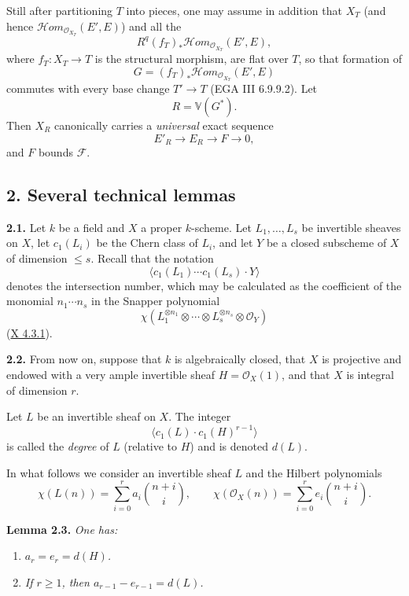 Still after partitioning \(T\) into pieces, one may assume in addition
that \(X_T\) (and hence
\(\mathcal H\!om_{\mathcal O_{X_T}}(E',E)\)) and all the
\[
R^q(f_T)_*\mathcal H\!om_{\mathcal O_{X_T}}(E',E),
\]
where \(f_T:X_T\to T\) is the structural morphism, are flat over \(T\),
so that formation of
\[
G=(f_T)_*\mathcal H\!om_{\mathcal O_{X_T}}(E',E)
\]
commutes with every base change \(T'\to T\) (EGA III 6.9.9.2). Let
\[
R=\mathbb V(G^*).
\]
Then \(X_R\) canonically carries a \emph{universal} exact sequence
\[
E'_R\longrightarrow E_R\longrightarrow F\longrightarrow0,
\]
and \(F\) bounds \(\mathcal F\).

\subsection*{2. Several technical lemmas}

\textbf{2.1.} Let \(k\) be a field and \(X\) a proper \(k\)-scheme. Let
\(L_1,\ldots,L_s\) be invertible sheaves on \(X\), let \(c_1(L_i)\) be the
Chern class of \(L_i\), and let \(Y\) be a closed subscheme of \(X\) of
dimension \(\le s\). Recall that the notation
\[
\bigl\langle c_1(L_1)\cdots c_1(L_s)\cdot Y\bigr\rangle
\]
denotes the intersection number, which may be calculated as the
coefficient of the monomial \(n_1\cdots n_s\) in the Snapper polynomial
\[
\chi\!\left(
L_1^{\otimes n_1}\otimes\cdots\otimes L_s^{\otimes n_s}
\otimes\mathcal O_Y
\right)
\]
(\hyperlink{sga6.e10.prop.4-3-1}{X 4.3.1}).

\textbf{2.2.} From now on, suppose that \(k\) is algebraically closed,
that \(X\) is projective and endowed with a very ample invertible sheaf
\(H=\mathcal O_X(1)\), and that \(X\) is integral of dimension \(r\).

Let \(L\) be an invertible sheaf on \(X\). The integer
\[
\bigl\langle c_1(L)\cdot c_1(H)^{r-1}\bigr\rangle
\]
is called the \emph{degree} of \(L\) (relative to \(H\)) and is denoted
\(d(L)\).

In what follows we consider an invertible sheaf \(L\) and the Hilbert
polynomials
\[
\chi(L(n))=\sum_{i=0}^{r}a_i\binom{n+i}{i},
\qquad
\chi(\mathcal O_X(n))=\sum_{i=0}^{r}e_i\binom{n+i}{i}.
\]

\textbf{Lemma 2.3.} \emph{One has:}
\begin{enumerate}[label=(\roman*)]
\item \emph{\(a_r=e_r=d(H)\).}
\item \emph{If \(r\ge1\), then \(a_{r-1}-e_{r-1}=d(L)\).}
\end{enumerate}

